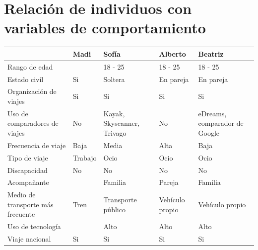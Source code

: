 \section{Relación de individuos con variables de comportamiento}
\begin{table}[H]
    \centering
    \begin{tabular}{|p{10em}||p{7em}|p{7em}|p{7em}|p{8em}|}
        \hline
                                          & Madi        & Sofía                          & Alberto            & Beatriz                         \\ \hline
        Rango de edad                     &             & 18 - 25                        & 18 - 25            & 18 - 25                         \\ \hline
        Estado civil                      & Si          & Soltera                        & En pareja          & En pareja                       \\ \hline
        Organización de viajes            & Si          & Si                             & Si                 & Si                              \\ \hline
        Uso de comparadores de viajes     & No          & Kayak, Skyscanner, Trivago     & No                 & eDreams, comparador de Google   \\ \hline
        Frecuencia de viaje               & Baja        & Media                          & Alta               & Baja                            \\ \hline
        Tipo de viaje                     & Trabajo     & Ocio                           & Ocio               & Ocio                            \\ \hline
        Discapacidad                      & No          & No                             & No                 & No                              \\ \hline
        Acompañante                       &             & Familia                        & Pareja             & Familia                         \\ \hline
        Medio de transporte más frecuente & Tren        & Transporte público             & Vehículo propio    & Vehículo propio                 \\ \hline
        Uso de tecnología                 &             & Alto                           & Alto               & Alto                            \\ \hline
        Viaje nacional                    & Si          & Si                             & Si                 & Si                              \\ \hline

\end{tabular}
\end{table}
